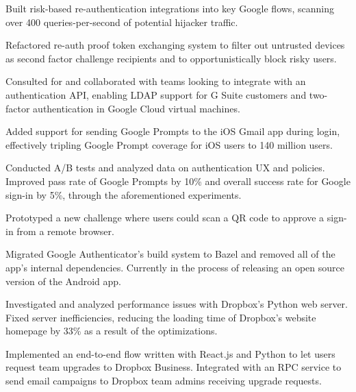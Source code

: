 \documentclass[]{template}
\begin{document}
\hfill
{}
\begin{tightemize}
\item
  Built risk-based re-authentication integrations into key Google flows,
  scanning over 400 queries-per-second of potential hijacker traffic.
\item
  Refactored re-auth proof token exchanging system to filter out untrusted
  devices as second factor challenge recipients and to opportunistically block
  risky users.
\item
  Consulted for and collaborated with
  teams looking to integrate with an authentication API, enabling LDAP
  support for G Suite customers and two-factor authentication in Google Cloud
  virtual machines.
\item
  Added support for sending Google Prompts to the iOS Gmail app during login,
  effectively tripling Google Prompt coverage for iOS users to 140 million
  users.
\item
  Conducted A/B tests and analyzed data on authentication UX and policies.
  Improved pass rate of Google Prompts by 10\%
  and overall success rate for Google sign-in by 5\%, through the aforementioned
  experiments.
\item
  Prototyped a new challenge where users could scan a QR code to approve a
  sign-in from a remote browser.
\item
  Migrated Google Authenticator's build system to Bazel and removed all of the
  app's internal dependencies. Currently in the process of releasing an open
  source version of the Android app.
\end{tightemize}

\sectionsep

\hfill
{}
\begin{tightemize}
\item
  Investigated and analyzed performance issues with Dropbox's Python web server.
  Fixed server inefficiencies, reducing the loading time of Dropbox's
  website homepage by 33\% as a result of the optimizations.
\item
  Implemented an end-to-end flow written with React.js and Python to let users
  request team upgrades to Dropbox Business. Integrated with an RPC service to
  send email campaigns to Dropbox team admins receiving upgrade requests.
\end{tightemize}
\end{document}
